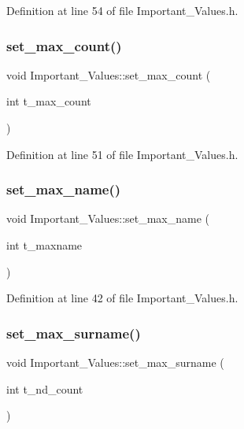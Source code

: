 Definition at line 54 of file Important\+\_\+\+Values.\+h.

\mbox{\label{class_important___values_a864e30dca6b4853122871636b3f8e720}} 
\subsubsection{\texorpdfstring{set\_max\_count()}{set\_max\_count()}}
{\footnotesize\ttfamily void Important\+\_\+\+Values\+::set\+\_\+max\+\_\+count (\begin{DoxyParamCaption}\item[{int}]{t\+\_\+max\+\_\+count }\end{DoxyParamCaption})\hspace{0.3cm}{\ttfamily [inline]}}



Definition at line 51 of file Important\+\_\+\+Values.\+h.

\mbox{\label{class_important___values_a64749e36f56461d36fc441ba023e5278}} 
\subsubsection{\texorpdfstring{set\_max\_name()}{set\_max\_name()}}
{\footnotesize\ttfamily void Important\+\_\+\+Values\+::set\+\_\+max\+\_\+name (\begin{DoxyParamCaption}\item[{int}]{t\+\_\+maxname }\end{DoxyParamCaption})\hspace{0.3cm}{\ttfamily [inline]}}



Definition at line 42 of file Important\+\_\+\+Values.\+h.

\mbox{\label{class_important___values_a45e78ac2787fede19eb0d9c2886edb40}} 
\subsubsection{\texorpdfstring{set\_max\_surname()}{set\_max\_surname()}}
{\footnotesize\ttfamily void Important\+\_\+\+Values\+::set\+\_\+max\+\_\+surname (\begin{DoxyParamCaption}\item[{int}]{t\+\_\+nd\+\_\+count }\end{DoxyParamCaption})\hspace{0.3cm}{\ttfamily [inline]}}



